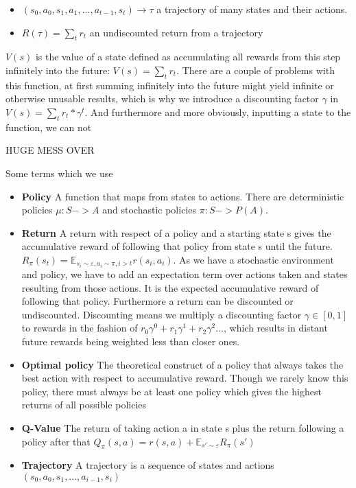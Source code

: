 \documentclass[hyperref,german,beleg]{cgvpub}
\begin{document}
\begin{itemize}
  \item \((s_0, a_0, s_1, a_1, ... , a_{t-1}, s_t) \rightarrow \tau\) a trajectory of many states and their actions.
  \item \(R(\tau) = \sum_t{r_t} \) an undiscounted return from a trajectory
\end{itemize}


\(V(s)\) is the value of a state defined as accumulating all rewards from this step infinitely into the future: \(V(s) = \sum_t{r_t}\). There are a couple of problems with this function, at first summing infinitely into the future might yield infinite or otherwise unusable results, which is why we introduce a discounting factor \(\gamma\) in \(V(s) = \sum_t{r_t * \gamma^t}\). And furthermore and more obviously, inputting a state to the function, we can not

HUGE MESS OVER

Some terms which we use
\begin{itemize}
  \item \textbf{Policy} A function that maps from states to actions. There are deterministic policies $\mu: S -> A$ and stochastic policies $\pi: S -> P(A)$.
  \item \textbf{Return} A return with respect of a policy and a starting state s gives the accumulative reward of following that policy from state s until the future. $R_{\pi}(s_t) = \mathbb{E}_{s_i \sim \varepsilon, a_i \sim \pi, i>t} r(s_i, a_i) $. As we have a stochastic environment and policy, we have to add an expectation term over actions taken and states resulting from those actions. It is the expected accumulative reward of following that policy. Furthermore a return can be discounted or undiscounted. Discounting means we multiply a discounting factor $\gamma \in [0,1]$ to rewards in the fashion of $r_0 \gamma^0 + r_1 \gamma^1 + r_2 \gamma^2 ...$, which results in distant future rewards being weighted less than closer ones.
  \item \textbf{Optimal policy} The theoretical construct of a policy that always takes the best action with respect to accumulative reward. Though we rarely know this policy, there must always be at least one policy which gives the highest returns of all possible policies
  \item \textbf{Q-Value} The return of taking action a in state s plus the return following a policy after that $Q_{\pi}(s,a) = r(s, a) + \mathbb{E}_{s' \sim \varepsilon} R_{\pi}(s')$
  \item \textbf{Trajectory} A trajectory is a sequence of states and actions $(s_0, a_0, s_1, ..., a_{i-1}, s_i)$
\end{itemize}
\end{document}
